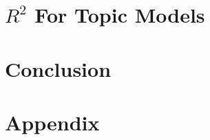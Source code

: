 \documentclass[12pt]{amsart}
\begin{document}
\section{$R^2$ For Topic Models}



\section{Conclusion}




\section{Appendix}

\newpage
\begin{thebibliography}{9}

 

\end{thebibliography}
\end{document}
